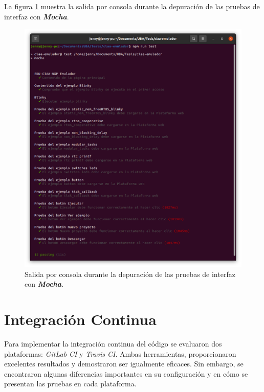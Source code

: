 La figura \ref{fig:TestVS1} muestra la salida por consola durante la depuración de las pruebas de interfaz con \textit{\textbf{Mocha}}.

\begin{figure}[ht]
	\centering
	\includegraphics[scale=.29]{./Figures/TestInterfaz.png}
	\caption{Salida por consola durante la depuración de las pruebas de interfaz con \textit{\textbf{Mocha}}.}
	\label{fig:TestVS1}
\end{figure}

\section{Integración Continua}
\label{sec:Integracion Continua}

Para implementar la integración continua del código se evaluaron dos plataformas:\textit{ GitLab CI} y \textit{Travis CI}. Ambas herramientas, proporcionaron excelentes resultados y demostraron ser igualmente eficaces. Sin embargo, se encontraron algunas diferencias importantes en su configuración y en cómo se presentan las pruebas en cada plataforma.


